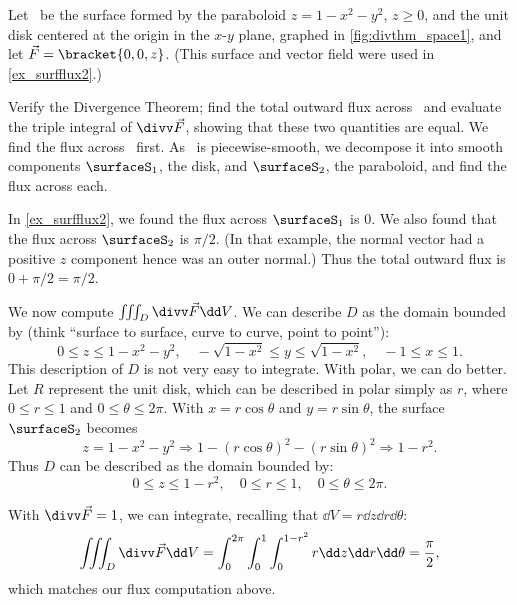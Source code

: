 \begin{example}\label{ex_divthm_space1}%
Let \surfaceS\ be the surface formed by the paraboloid $z=1-x^2-y^2$, $z\geq 0$, and the unit disk centered at the origin in the $x$-$y$ plane, graphed in \autoref{fig:divthm_space1}, and let $\vec F =\bracket{0,0,z}$. (This surface and vector field were used in \autoref{ex_surfflux2}.)

Verify the Divergence Theorem; find the total outward flux across \surfaceS\ and evaluate the triple integral of $\divv \vec F$, showing that these two quantities are equal.
\solution
We find the flux across \surfaceS\ first. As \surfaceS\ is piecewise-smooth, we decompose it into smooth components $\surfaceS_1$, the disk, and $\surfaceS_2$, the paraboloid, and find the flux across each.

In \autoref{ex_surfflux2}, we found the flux across $\surfaceS_1$ is 0. We also found that the flux across $\surfaceS_2$ is $\pi/2$. (In that example, the normal vector had a positive $z$ component hence was an outer normal.) Thus the total outward flux is $0+\pi/2 = \pi/2$.

We now compute $\iiint_D \divv \vec F\dd V$. We can describe $D$ as the domain bounded by (think ``surface to surface, curve to curve, point to point''):
\[
0\leq z\leq 1-x^2-y^2,
\quad -\sqrt{1-x^2}\leq y\leq \sqrt{1-x^2},
\quad -1\leq x\leq 1.
\]
This description of $D$ is not very easy to integrate. With polar, we can do better. Let $R$ represent the unit disk, which can be described in polar simply as $r$, where $0\leq r\leq 1$ and $0\leq \theta\leq 2\pi$. With $x=r\cos \theta$ and $y=r\sin\theta$, the surface $\surfaceS_2$ becomes
\[z=1-x^2-y^2 \Rightarrow 1-(r\cos\theta)^2-(r\sin\theta)^2 \Rightarrow 1-r^2.\]
Thus $D$ can be described as the domain bounded by:
\[0\leq z\leq 1-r^2,\quad 0\leq r\leq 1,\quad 0\leq \theta\leq 2\pi.\]

With $\divv \vec F = 1$, we can integrate, recalling that $\dd V = r\dd z\dd r\dd\theta$:
\[
\iiint_D\divv \vec F\dd V
= \int_0^{2\pi}\int_0^1\int_0^{1-r^2} r\dd z\dd r\dd\theta = \frac{\pi}2,
\]
which matches our flux computation above.
\end{example}

